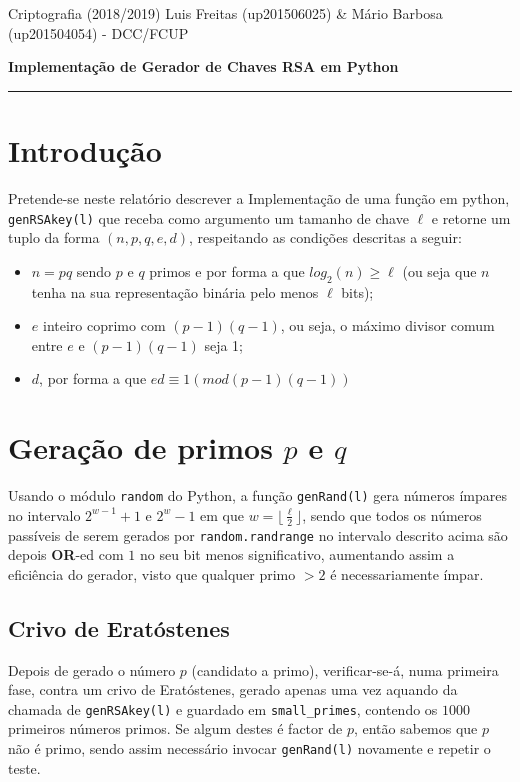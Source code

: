 \documentclass[dvipsnames]{article}
\begin{document}
\noindent Criptografia (2018/2019)
\hfill Luis Freitas (up201506025) \& Mário Barbosa (up201504054) - DCC/FCUP

\begin{center}\LARGE\bf 
  Implementação de Gerador de Chaves RSA em Python \\
\end{center}

\vskip 0.4cm
\hrule
\vskip 0.4cm

\begin{multicols}{2}
  \section{Introdução}
  Pretende-se neste relatório descrever a Implementação de uma função em python, \texttt{genRSAkey(l)} que receba como argumento um tamanho de chave $\ell$ e retorne um tuplo da forma $(n,p,q,e,d)$, respeitando as condições descritas a seguir:
  \begin{itemize}
    \item $n=pq$ sendo $p$ e $q$ primos e por forma a que $log_2(n) \geq \ell$ (ou seja que $n$ tenha na sua representação binária pelo menos $\ell$ bits);
    \item $e$ inteiro coprimo com $(p-1)(q-1)$, ou seja, o máximo divisor comum entre $e$ e $(p-1)(q-1)$ seja 1;
    \item $d$, por forma a que $ed \equiv 1 (mod (p-1)(q-1))$
  \end{itemize}
  
  \section{Geração de primos $p$ e $q$}
  Usando o módulo \texttt{random} do Python, a função \texttt{genRand(l)} gera números ímpares no intervalo $2^{w-1} + 1$ e $2^{w} - 1$ em que $w=\lfloor \frac{\ell}{2} \rfloor$, sendo que todos os números passíveis de serem gerados por \texttt{random.randrange} no intervalo descrito acima são depois \textbf{OR}-ed com $1$ no seu bit menos significativo, aumentando assim a eficiência do gerador, visto que qualquer primo $>2$ é necessariamente ímpar.
  
  \vskip 0.4cm
  
  \subsection{Crivo de Eratóstenes}
  
  Depois de gerado o número $p$ (candidato a primo), verificar-se-á, numa primeira fase, contra um crivo de Eratóstenes, gerado apenas uma vez aquando da chamada de \texttt{genRSAkey(l)} e guardado em \texttt{small\_primes}, contendo os $1000$ primeiros números primos. Se algum destes é factor de $p$, então sabemos que $p$ não é primo, sendo assim necessário invocar \texttt{genRand(l)} novamente e repetir o teste.
  

\end{multicols}
\end{document}
